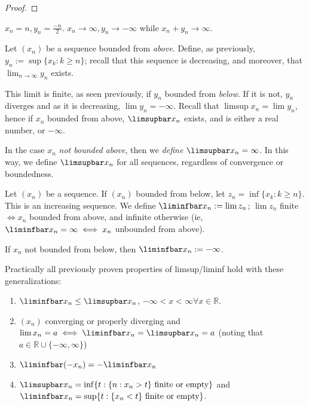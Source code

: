 \documentclass[12pt]{article}
\begin{document}
\begin{proof}
\end{proof}

\begin{example}
  $x_n = n, y_n = \frac{-n}{2}$. $x_n \to \infty, y_n \to - \infty$ while $x_n + y_n \to \infty$.
\end{example}

\begin{definition}
  Let $(x_n)$ be a sequence bounded from \emph{above}. Define, as previously, $y_n := \sup \{x_k : k \geq n\}$; recall that this sequence is decreasing, and moreover, that $\lim_{n\to\infty} y_n$ exists. 
  
  This limit is finite, as seen previously, if $y_n$ bounded from \emph{below}. If it is not, $y_n$ diverges and as it is decreasing, $\lim y_n = - \infty$. Recall that $\limsup x_n = \lim y_n$, hence if $x_n$ bounded from above, $\limsupbar x_n$ exists, and is either a real number, or $-\infty$.

  In the case $x_n$ \emph{not bounded above}, then we \emph{define} $\limsupbar x_n = \infty$. In this way, we define $\limsupbar x_n$ for all sequences, regardless of convergence or boundedness.
\end{definition}

\begin{definition}
  Let $(x_n)$ be a sequence. If $(x_n)$ bounded from below, let $z_n = \inf \{x_k : k \geq n\}$. This is an increasing sequence. We define $\liminfbar x_n := \lim z_n$; $\lim z_n $ finite $\iff x_n$ bounded from above, and infinite otherwise (ie, $\liminfbar x_n = \infty \iff x_n$ unbounded from above).

  If $x_n$ not bounded from below, then $\liminfbar x_n := - \infty$.
\end{definition}

\begin{proposition}
  Practically all previously proven properties of limsup/liminf hold with these generalizations:
  \begin{enumerate}
    \item $\liminfbar x_n \leq \limsupbar x_n$, $-\infty < x < \infty \forall x \in \mathbb{R}$.
    \item $(x_n)$ converging or properly diverging and $\lim x_n = a \iff \liminfbar x_n= \limsupbar x_n = a$ (noting that $a \in \mathbb{R} \cup \{-\infty, \infty\}$\footnotemark)
    \item $\liminfbar (-x_n) = - \liminfbar x_n$\footnotemark
    \item $\limsupbar x_n = \inf \{
      t : \{n : x_n > t\} \text{ finite or empty}
    \}$ and $\liminfbar x_n = \sup \{t : \{x_n < t\} \text{ finite or empty}\}$.\footnotemark
  \end{enumerate}
\end{proposition}
\end{document}

